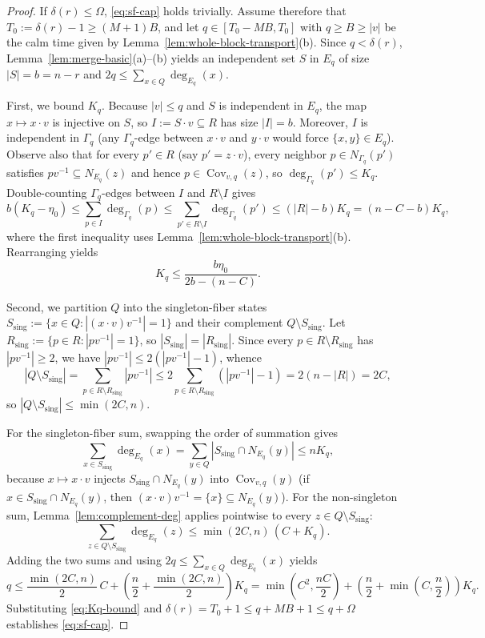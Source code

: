 \documentclass[11pt]{article}
\theoremstyle{definition}
\theoremstyle{remark}
\newcommand{\Cov}{\operatorname{Cov}}
\begin{document}
\begin{proof}
If $\delta(r) \le \Omega$, \eqref{eq:sf-cap} holds trivially. Assume therefore that $T_0 := \delta(r) - 1 \ge (M + 1) B$, and let $q \in [T_0 - M B, T_0]$ with $q \ge B \ge |v|$ be the calm time given by Lemma~\ref{lem:whole-block-transport}(b). Since $q < \delta(r)$, Lemma~\ref{lem:merge-basic}(a)--(b) yields an independent set $S$ in $E_q$ of size $|S| = b = n - r$ and $2q \le \sum_{x \in Q} \deg_{E_q}(x)$.

First, we bound $K_q$. Because $|v| \le q$ and $S$ is independent in $E_q$, the map $x \mapsto x \cdot v$ is injective on $S$, so $I := S \cdot v \subseteq R$ has size $|I| = b$. Moreover, $I$ is independent in $\Gamma_q$ (any $\Gamma_q$-edge between $x \cdot v$ and $y \cdot v$ would force $\{x, y\} \in E_q$). Observe also that for every $p' \in R$ (say $p' = z \cdot v$), every neighbor $p \in N_{\Gamma_q}(p')$ satisfies $p v^{-1} \subseteq N_{E_q}(z)$ and hence $p \in \Cov_{v, q}(z)$, so $\deg_{\Gamma_q}(p') \le K_q$. Double-counting $\Gamma_q$-edges between $I$ and $R \setminus I$ gives
\[
  b(K_q - \eta_0) \le \sum_{p \in I} \deg_{\Gamma_q}(p) \le \sum_{p' \in R \setminus I} \deg_{\Gamma_q}(p') \le (|R| - b) K_q = (n - C - b) K_q,
\]
where the first inequality uses Lemma~\ref{lem:whole-block-transport}(b). Rearranging yields
\begin{equation}\label{eq:Kq-bound}
  K_q \le \frac{b \eta_0}{2b - (n - C)}.
\end{equation}

Second, we partition $Q$ into the singleton-fiber states $S_{\mathrm{sing}} := \{x \in Q : |(x \cdot v) v^{-1}| = 1\}$ and their complement $Q \setminus S_{\mathrm{sing}}$. Let $R_{\mathrm{sing}} := \{p \in R : |p v^{-1}| = 1\}$, so $|S_{\mathrm{sing}}| = |R_{\mathrm{sing}}|$. Since every $p \in R \setminus R_{\mathrm{sing}}$ has $|p v^{-1}| \ge 2$, we have $|p v^{-1}| \le 2(|p v^{-1}| - 1)$, whence
\[
  |Q \setminus S_{\mathrm{sing}}| = \sum_{p \in R \setminus R_{\mathrm{sing}}} |p v^{-1}|
  \le 2 \sum_{p \in R \setminus R_{\mathrm{sing}}} (|p v^{-1}| - 1)
  = 2 (n - |R|) = 2C,
\]
so $|Q \setminus S_{\mathrm{sing}}| \le \min(2C, n)$.

For the singleton-fiber sum, swapping the order of summation gives
\[
  \sum_{x \in S_{\mathrm{sing}}} \deg_{E_q}(x) = \sum_{y \in Q} |S_{\mathrm{sing}} \cap N_{E_q}(y)| \le n K_q,
\]
because $x \mapsto x \cdot v$ injects $S_{\mathrm{sing}} \cap N_{E_q}(y)$ into $\Cov_{v, q}(y)$ (if $x \in S_{\mathrm{sing}} \cap N_{E_q}(y)$, then $(x \cdot v) v^{-1} = \{x\} \subseteq N_{E_q}(y)$). For the non-singleton sum, Lemma~\ref{lem:complement-deg} applies pointwise to every $z \in Q \setminus S_{\mathrm{sing}}$:
\[
  \sum_{z \in Q \setminus S_{\mathrm{sing}}} \deg_{E_q}(z) \le \min(2C, n)\,(C + K_q).
\]
Adding the two sums and using $2q \le \sum_{x \in Q} \deg_{E_q}(x)$ yields
\[
  q \le \frac{\min(2C, n)}{2}\, C + \left(\frac{n}{2} + \frac{\min(2C, n)}{2}\right) K_q
    = \min\!\left(C^2, \frac{nC}{2}\right) + \left(\frac{n}{2} + \min\!\left(C, \frac{n}{2}\right)\right) K_q.
\]
Substituting \eqref{eq:Kq-bound} and $\delta(r) = T_0 + 1 \le q + M B + 1 \le q + \Omega$ establishes \eqref{eq:sf-cap}.
\end{proof}
\end{document}
